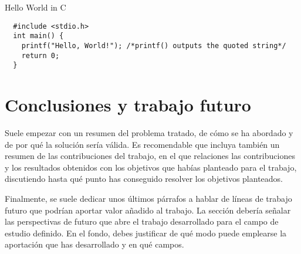 \documentclass[12pt,a4paper]{articuloAPA}
\begin{document}
\begin{listing}[!ht]
  \label{listing:2}
  \caption{Hello World in C} 
  \vspace{-5pt}
  \begin{verbatim}
  #include <stdio.h>
  int main() {
    printf("Hello, World!"); /*printf() outputs the quoted string*/
    return 0;
  }
  \end{verbatim}
\end{listing}

\section{Conclusiones y trabajo futuro}

Suele empezar con un resumen del problema tratado, de cómo se ha abordado y de por qué la solución sería válida. Es recomendable que incluya también un resumen de las contribuciones del trabajo, en el que relaciones las contribuciones y los resultados obtenidos con los objetivos que habías planteado para el trabajo, discutiendo hasta qué punto has conseguido resolver los objetivos planteados.

Finalmente, se suele dedicar unos últimos párrafos a hablar de líneas de trabajo futuro que podrían aportar valor añadido al trabajo. La sección debería señalar las perspectivas de futuro que abre el trabajo desarrollado para el campo de estudio definido. En el fondo, debes justificar de qué modo puede emplearse la aportación que has desarrollado y en qué campos.



\printbibliography[title=Referencias bibliográficas]
\end{document}
